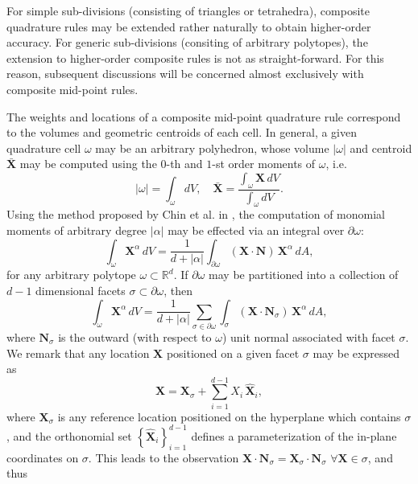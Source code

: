 	For simple sub-divisions (consisting of triangles or tetrahedra), composite quadrature rules may be extended rather naturally to obtain higher-order accuracy. For generic sub-divisions (consiting of arbitrary polytopes), the extension to higher-order composite rules is not as straight-forward. For this reason, subsequent discussions will be concerned almost exclusively with composite mid-point rules.
	
	The weights and locations of a composite mid-point quadrature rule correspond to the volumes and geometric centroids of each cell. In general, a given quadrature cell $\omega$ may be an arbitrary polyhedron, whose volume $|\omega|$ and centroid $\bar{\mathbf{X}}$ may be computed using the $0$-th and $1$-st order moments of $\omega$, i.e.
	\begin{equation}
		|\omega| = \int_{\omega} dV, \quad \bar{\mathbf{X}} = \frac{\int_{\omega} \mathbf{X} \, dV}{\int_{\omega} dV}.
	\end{equation}
	Using the method proposed by Chin et al. in \cite{Chin:15}, the computation of monomial moments of arbitrary degree $|\alpha|$ may be effected via an integral over $\partial \omega$:
	\begin{equation}
		\int_{\omega} \mathbf{X}^\alpha \, dV = \frac{1}{d+|\alpha|} \int_{\partial \omega} (\mathbf{X} \cdot \mathbf{N}) \, \mathbf{X}^\alpha \, dA,
	\end{equation}
	for any arbitrary polytope $\omega \subset \mathbb{R}^d$. If $\partial \omega$ may be partitioned into a collection of $d-1$ dimensional facets $\sigma \subset \partial \omega$, then
	\begin{equation}
		\int_{\omega} \mathbf{X}^\alpha \, dV = \frac{1}{d+|\alpha|} \sum_{\sigma \in \partial \omega} \int_{\sigma} (\mathbf{X} \cdot \mathbf{N}_{\sigma}) \, \mathbf{X}^\alpha \, dA,
	\end{equation}
	where $\mathbf{N}_\sigma$ is the outward (with respect to $\omega$) unit normal associated with facet $\sigma$. We remark that any location $\mathbf{X}$ positioned on a given facet $\sigma$ may be expressed as
	\begin{equation}
		\mathbf{X} = \mathbf{X}_\sigma + \sum_{i=1}^{d-1} X_i \, \hat{\mathbf{X}}_i,
	\end{equation}
	where $\mathbf{X}_\sigma$ is any reference location positioned on the hyperplane which contains $\sigma$, and the orthonomial set $\left\{ \hat{\mathbf{X}}_i \right\}_{i=1}^{d-1}$ defines a parameterization of the in-plane coordinates on $\sigma$. This leads to the observation $\mathbf{X} \cdot \mathbf{N}_\sigma = \mathbf{X}_\sigma \cdot \mathbf{N}_\sigma \, \, \forall \mathbf{X} \in \sigma$, and thus
